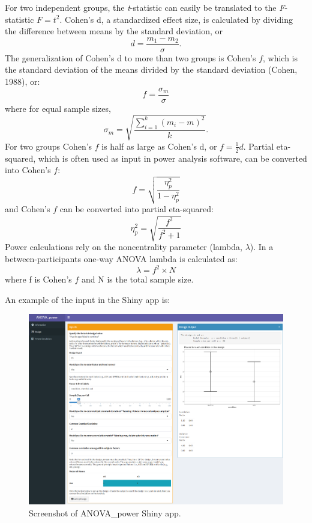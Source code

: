\documentclass[
  ,jou,floatsintext]{apa6}
\begin{document}
\begin{tcolorbox}[colback=black!5!white,colframe=white!5!black,title=Box 1. Formula for effect sizes for ANOVA designs]
For two independent groups, the \textit{t}-statistic can easily be translated to the \textit{F}-statistic $F = t^2$.
Cohen's d, a standardized effect size, is calculated by dividing the difference between means by the standard deviation, or 
\begin{equation}
d = \frac{m_1-m_2}{\sigma}.
\end{equation}
The generalization of Cohen's d to more than two groups is Cohen's $f$, which is the standard deviation of the means divided by the standard deviation (Cohen, 1988), or: 
\begin{equation}
f = \frac{\sigma _{ m }}{\sigma}
\end{equation}
where for equal sample sizes,
\begin{equation}
\sigma _{ m } = \sqrt { \frac { \sum_ { i = 1 } ^ { k } ( m _ { i } - m ) ^ { 2 } } { k } }.
\end{equation}
For two groups Cohen's $f$ is half as large as Cohen's d, or $f = \frac{1}{2}d$.
Partial eta-squared, which is often used as input in power analysis software, can be converted into Cohen's $f$:
\begin{equation}
f = \sqrt{\frac{\eta_p^2}{1-\eta_p^2}} \label{eq:eta-to-f}
\end{equation}
and Cohen's $f$ can be converted into partial eta-squared:
\begin{equation}
\eta_p^2 = \sqrt{\frac{f^2}{f^2+1}} \label{eq:f-to-eta}
\end{equation}
Power calculations rely on the noncentrality parameter (lambda, $\lambda$).
In a between-participants one-way ANOVA lambda is calculated as:
\begin{equation}
\lambda = f^2 \times N \label{eq:lambda}
\end{equation}
where f is Cohen's $f$ and N is the total sample size. 
\end{tcolorbox}

An example of the input in the Shiny app is:

\begin{figure}
\centering
\includegraphics{screenshots/anova_power.png}
\caption{Screenshot of ANOVA\_power Shiny app.}
\end{figure}
\end{document}
